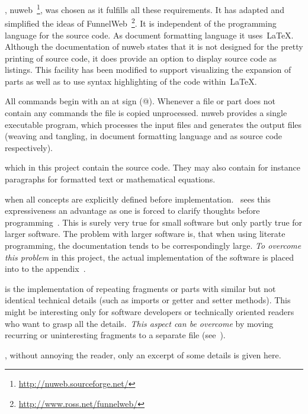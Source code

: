\documentclass[%
    a4paper,    %
    justified,  %
    nobib,      %
    openany     %
]{tufte-book}
\begin{document}
,
nuweb~\footnote{\url{http://nuweb.sourceforge.net/}}, was chosen as it fulfills
all these requirements. It has adapted and simplified the ideas of
FunnelWeb~\footnote{\url{http://www.ross.net/funnelweb/}}. It is independent of
the programming language for the source code. As document formatting language it
uses~\LaTeX{}. Although the documentation of nuweb states that it is not
designed for the pretty printing of source code, it does provide an option to
display source code as listings. This facility has been modified to support
visualizing the expansion of parts as well as to use syntax highlighting of the
code within~\LaTeX{}.

 All
commands begin with an at sign (@). Whenever a file or part does not contain
any commands the file is copied unprocessed. nuweb provides a single executable
program, which processes the input files and generates the output files (weaving
and tangling, in document formatting language and as source code respectively).

 which in this project contain the
source code. They may also contain for instance paragraphs for formatted text or
mathematical equations.

 when all concepts are
explicitly defined before implementation.~\citeauthor{knuth-lp-1984} sees this
expressiveness an advantage as one is forced to clarify thoughts before
programming~\cite[p. 13]{knuth-lp-1984}. This is surely very true for small
software but only partly true for larger software. The problem with larger
software is, that when using literate programming, the documentation tends to be
correspondingly large. \emph{To overcome this problem} in this project, the
actual implementation of the software is placed into to the
appendix~.

 is the implementation of repeating
fragments or parts with similar but not identical technical details (such as imports
or getter and setter methods). This might be interesting only for
software developers or technically oriented readers who want to grasp all the
details.~\emph{This aspect can
be overcome} by moving recurring or uninteresting fragments to a separate
file (see~).

,
without annoying the reader, only an excerpt of some details is given here.
\end{document}
